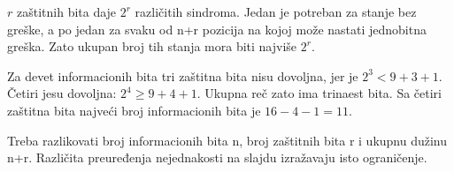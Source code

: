 $r$ zaštitnih bita daje $2^r$ različitih sindroma. Jedan je potreban za stanje bez greške, a po jedan za svaku od n+r pozicija na kojoj može nastati jednobitna greška. Zato ukupan broj tih stanja mora biti najviše $2^r$.

Za devet informacionih bita tri zaštitna bita nisu dovoljna, jer je $2^3<9+3+1$. Četiri jesu dovoljna: $2^4\ge9+4+1$. Ukupna reč zato ima trinaest bita. Sa četiri zaštitna bita najveći broj informacionih bita je $16-4-1=11$.

Treba razlikovati broj informacionih bita n, broj zaštitnih bita r i ukupnu dužinu n+r. Različita preuređenja nejednakosti na slajdu izražavaju isto ograničenje.
